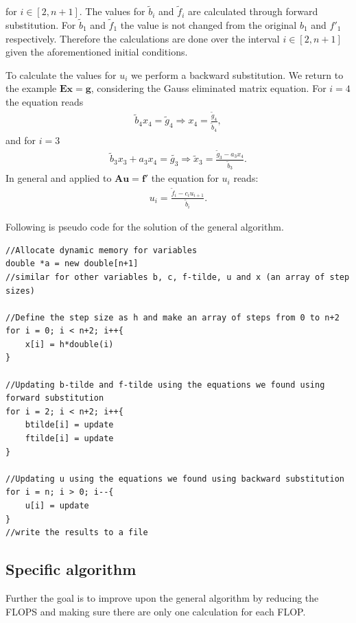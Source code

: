 \documentclass{emulateapj}
\begin{document}
for $i \in [2,n+1]$. The values for $\tilde{b}_i$ and $\tilde{f}_i$ are calculated through forward substitution. For $\tilde{b}_1$ and $\tilde{f}_1$ the value is not changed from the original $b_1$ and $f'_1$ respectively. Therefore the calculations are done over the interval $i \in [2,n+1]$ given the aforementioned initial conditions.

To calculate the values for $u_i$ we perform a backward substitution. We return to the example $\boldsymbol{E}\boldsymbol{x} = \boldsymbol{g}$, considering the Gauss eliminated matrix equation. For $i=4$ the equation reads
%
\begin{gather*}
    \tilde{b}_4 x_4 = \tilde{g}_4 \Rightarrow x_4 = \frac{\tilde{g}_4}{\tilde{b}_4},
\end{gather*}
%
and for $i=3$
%
\begin{gather*}
    \tilde{b}_3 x_3 + a_3 x_4 = \tilde{g_3} \Rightarrow \tilde{x}_3 = \frac{\tilde{g}_3 - a_3 x_4}{\tilde{b}_3}.
\end{gather*}
%
In general and applied to $\boldsymbol{A} \boldsymbol{u} = \boldsymbol{f'}$ the equation for $u_i$ reads:
%
\begin{gather}\label{eq:u_i}
    u_i = \frac{\tilde{f}_i - c_i u_{i+1}}{\tilde{b}_i}.
\end{gather}
%

Following is pseudo code for the solution of the general algorithm.
%
\begin{lstlisting}
//Allocate dynamic memory for variables
double *a = new double[n+1]
//similar for other variables b, c, f-tilde, u and x (an array of step sizes)

//Define the step size as h and make an array of steps from 0 to n+2
for i = 0; i < n+2; i++{
    x[i] = h*double(i)
}

//Updating b-tilde and f-tilde using the equations we found using forward substitution
for i = 2; i < n+2; i++{
    btilde[i] = update
    ftilde[i] = update
}

//Updating u using the equations we found using backward substitution
for i = n; i > 0; i--{
    u[i] = update
}
//write the results to a file

\end{lstlisting}
%


\subsection{Specific algorithm}
Further the goal is to improve upon the general algorithm by reducing the FLOPS and making sure there are only one calculation for each FLOP.
\end{document}
